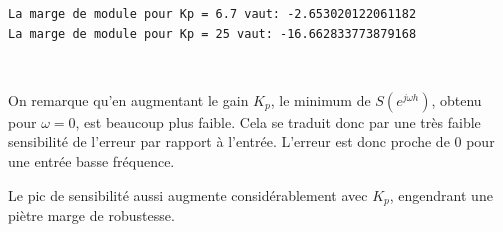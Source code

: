 \documentclass[11pt]{article}
\begin{document}
    \begin{Verbatim}[commandchars=\\\{\}]
La marge de module pour Kp = 6.7 vaut: -2.653020122061182
La marge de module pour Kp = 25 vaut: -16.662833773879168
    \end{Verbatim}

    \begin{center}
    \end{center}
    { \hspace*{\fill} \\}
    
    On remarque qu'en augmentant le gain \(K_p\), le minimum de
\(S(e^{j\omega h})\), obtenu pour \(\omega = 0\), est beaucoup plus
faible. Cela se traduit donc par une très faible sensibilité de l'erreur
par rapport à l'entrée. L'erreur est donc proche de 0 pour une entrée
basse fréquence.

Le pic de sensibilité aussi augmente considérablement avec \(K_p\),
engendrant une piètre marge de robustesse.



    
    
    
\end{document}
